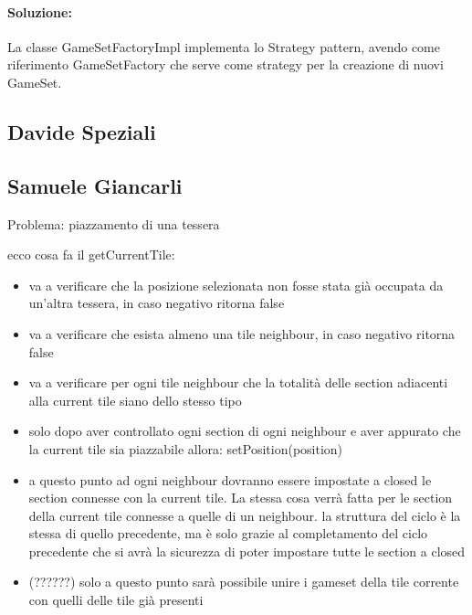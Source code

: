 \paragraph{Soluzione:}
La classe GameSetFactoryImpl implementa lo Strategy pattern, avendo come riferimento GameSetFactory che serve come strategy per la creazione di nuovi GameSet.

\subsection*{Davide Speziali}

\subsection*{Samuele Giancarli}


Problema: piazzamento di una tessera 



ecco cosa fa il getCurrentTile:

\begin{itemize}
\item va a verificare che la posizione selezionata non fosse stata già occupata da un’altra tessera, in caso negativo ritorna false
\item va a verificare che esista almeno una tile neighbour, in caso negativo ritorna false
\item va a verificare per ogni tile neighbour che la totalità delle section adiacenti alla current tile siano dello stesso tipo
\item solo dopo aver controllato ogni section di ogni neighbour e aver appurato che la current tile sia piazzabile allora: setPosition(position)
\item a questo punto ad ogni neighbour dovranno essere impostate a closed le section connesse con la current tile. La stessa cosa verrà fatta per le section della current tile connesse a quelle di un neighbour.
\subitem la struttura del ciclo è la stessa di quello precedente, ma è solo grazie al completamento del ciclo precedente che si avrà la sicurezza di poter impostare tutte le section a closed
\item (??????) solo a questo punto sarà possibile unire i gameset della tile corrente con quelli delle tile già presenti
\end{itemize}
